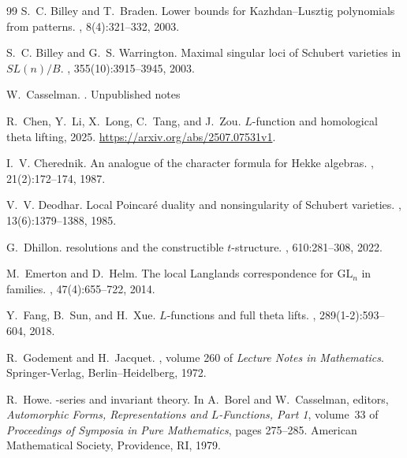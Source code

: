 \documentclass[10pt,a4paper]{article}
\theoremstyle{definition}
\theoremstyle{remark}
\numberwithin{equation}{section}
\begin{document}
\begin{thebibliography}{99}
S.~C. Billey and T.~Braden.
\newblock Lower bounds for {Kazhdan--Lusztig} polynomials from patterns.
, 8(4):321--332, 2003.

S.~C. Billey and G.~S. Warrington.
\newblock Maximal singular loci of {Schubert} varieties in {$SL(n)/B$}.
, 355(10):3915--3945, 2003.

W.~Casselman.
.
\newblock Unpublished notes

R.~Chen, Y.~Li, X.~Long, C.~Tang, and J.~Zou.
 {$L$}-function and homological theta lifting,
  2025.
\newblock \url{https://arxiv.org/abs/2507.07531v1}.

I.~V. Cherednik.
\newblock An analogue of the character formula for {Hekke} algebras.
, 21(2):172--174, 1987.

V.~V. Deodhar.
\newblock Local {Poincar\'e} duality and nonsingularity of {Schubert} varieties.
, 13(6):1379--1388, 1985.

G.~Dhillon.
 resolutions and the constructible
  {$t$}-structure.
, 610:281--308, 2022.

M.~Emerton and D.~Helm.
\newblock The local {Langlands} correspondence for {$\mathrm{GL}_n$} in
  families.
, 47(4):655--722, 2014.

Y.~Fang, B.~Sun, and H.~Xue.
 {$L$}-functions and full theta lifts.
, 289(1-2):593--604, 2018.

R.~Godement and H.~Jacquet.
, volume 260 of {\em Lecture
  Notes in Mathematics}.
\newblock Springer-Verlag, Berlin--Heidelberg, 1972.

R.~Howe.
\newblock {$\theta$}-series and invariant theory.
\newblock In A.~Borel and W.~Casselman, editors, {\em Automorphic Forms,
  Representations and {$L$}-Functions, Part 1}, volume~33 of {\em Proceedings
  of Symposia in Pure Mathematics}, pages 275--285. American Mathematical
  Society, Providence, RI, 1979.


\end{thebibliography}
\end{document}
